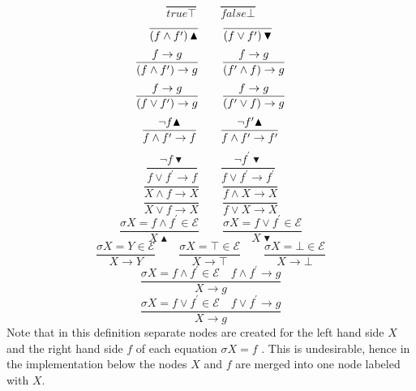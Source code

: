 \begin{equation*}
\frac{{}}{true\top }\qquad \frac{{}}{false\bot }
\end{equation*}%
\begin{equation*}
\frac{{}}{\left( f\wedge f^{\prime }\right) \blacktriangle }\qquad \frac{{}}{%
\left( f\vee f^{\prime }\right) \blacktriangledown }
\end{equation*}%
\begin{equation*}
\frac{f\rightarrow g}{(f\wedge f^{\prime })\rightarrow g}\qquad \frac{%
f\rightarrow g}{(f^{\prime }\wedge f)\rightarrow g}
\end{equation*}%
\begin{equation*}
\frac{f\rightarrow g}{(f\vee f^{\prime })\rightarrow g}\qquad \frac{%
f\rightarrow g}{(f^{\prime }\vee f)\rightarrow g}
\end{equation*}%
\begin{equation*}
\frac{\lnot f\blacktriangle }{f\wedge f^{\prime }\rightarrow f}\qquad \frac{%
\lnot f^{\prime }\blacktriangle }{f\wedge f^{\prime }\rightarrow f^{\prime }}
\end{equation*}%
\begin{equation*}
\frac{\lnot f\blacktriangledown }{f\vee f^{\prime }\rightarrow f}\qquad 
\frac{\lnot f^{\prime }\blacktriangledown }{f\vee f^{\prime }\rightarrow
f^{\prime }}
\end{equation*}%
\begin{equation*}
\frac{{}}{X\wedge f\rightarrow X}\qquad \frac{{}}{f\wedge X\rightarrow X}
\end{equation*}%
\begin{equation*}
\frac{{}}{X\vee f\rightarrow X}\qquad \frac{{}}{f\vee X\rightarrow X}
\end{equation*}%
\begin{equation*}
\frac{\sigma X=f\wedge f^{\prime }\in \mathcal{E}}{X\blacktriangle }\qquad 
\frac{\sigma X=f\vee f^{\prime }\in \mathcal{E}}{X\blacktriangledown }
\end{equation*}%
\begin{equation*}
\frac{\sigma X=Y\in \mathcal{E}}{X\rightarrow Y}\qquad \frac{\sigma X=\top
\in \mathcal{E}}{X\rightarrow \top }\qquad \frac{\sigma X=\bot \in \mathcal{E%
}}{X\rightarrow \bot }
\end{equation*}%
\begin{equation*}
\frac{\sigma X=f\wedge f^{\prime }\in \mathcal{E}\quad f\wedge f^{\prime
}\rightarrow g}{X\rightarrow g}
\end{equation*}%
\begin{equation*}
\frac{\sigma X=f\vee f^{\prime }\in \mathcal{E}\quad f\vee f^{\prime
}\rightarrow g}{X\rightarrow g}
\end{equation*}%
Note that in this definition separate nodes are created for the left hand
side $X$ and the right hand side $f$ of each equation $\sigma X=f$ . This is
undesirable, hence in the implementation below the nodes $X$ and $f$ are
merged into one node labeled with $X$.

